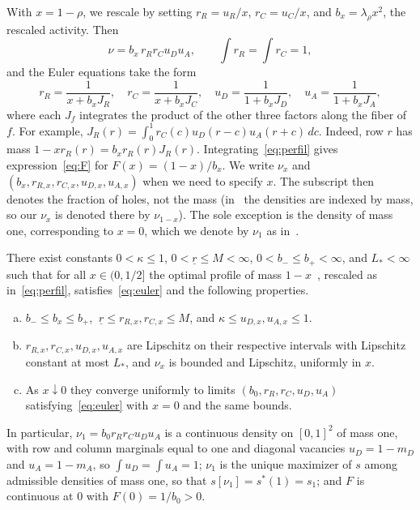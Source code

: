 With $x=1-\rho$, we rescale by setting $r_R=u_R/x$, $r_C=u_C/x$, and $b_x=\lambda_\rho x^2$, the rescaled
activity. Then
\begin{equation}\label{eq:perfil}
 \nu=b_x\,r_Rr_Cu_Du_A,\qquad \int r_R=\int r_C=1,
\end{equation} and the Euler equations take the form \begin{equation}\label{eq:euler}
 r_R=\frac1{x+b_xJ_R},\quad r_C=\frac1{x+b_xJ_C},\quad
 u_D=\frac1{1+b_xJ_D},\quad u_A=\frac1{1+b_xJ_A},
\end{equation} where each $J_f$ integrates the product of the other three factors along the fiber of $f$.
For example,
$J_R(r)=\int_0^1r_C(c)u_D(r-c)u_A(r+c)\,dc$. Indeed, row $r$ has mass $1-xr_R(r)=b_xr_R(r)J_R(r)$.
Integrating~\eqref{eq:perfil} gives
expression~\eqref{eq:F} for $F(x)=(1-x)/b_x$. We write $\nu_x$ and $(b_x,r_{R,x},r_{C,x},u_{D,x},u_{A,x})$
when we need to specify $x$.
The subscript then denotes the fraction of holes, not the mass (in~\cite{Perfil} the densities are indexed
by mass, so our $\nu_x$ is denoted there
by $\nu_{1-x}$). The sole exception is the density of mass one, corresponding to $x=0$, which we denote by
$\nu_1$ as in~\cite{Perfil}.

\begin{teorema}\label{thm:perfil} There exist constants
$0<\kappa\le1$, $0<\underline
r\le M<\infty$, $0<b_-\le
b_+<\infty$, and $L_*<\infty$ such that for all $x\in(0,1/2]$ the optimal profile of mass
$1-x$~\cite[Theorem~3.1]{Perfil}, rescaled as in~\eqref{eq:perfil}, satisfies~\eqref{eq:euler} and the
following properties.
\begin{enumerate}[(a)] \item $b_-\le b_x\le b_+$, $\ \underline r\le r_{R,x},r_{C,x}\le M$, and
$\kappa\le u_{D,x},u_{A,x}\le1$. \item
$r_{R,x},r_{C,x},u_{D,x},u_{A,x}$ are Lipschitz on their respective intervals with Lipschitz constant at
most $L_*$, and $\nu_x$ is
bounded and Lipschitz, uniformly in $x$. \item As $x\downarrow0$ they converge uniformly to limits
$(b_0,r_R,r_C,u_D,u_A)$
satisfying~\eqref{eq:euler} with $x=0$ and the same bounds. \end{enumerate} In particular,
$\nu_1=b_0r_Rr_Cu_Du_A$ is a continuous
density on $[0,1]^2$ of mass one, with row and column marginals equal to one and diagonal vacancies
$u_D=1-m_D$ and $u_A=1-m_A$, so
$\int u_D=\int u_A=1$; $\nu_1$ is the unique maximizer of $s$ among admissible densities of mass one, so
that
$s[\nu_1]=s^*(1)=s_1$; and $F$ is continuous at $0$ with $F(0)=1/b_0>0$. \end{teorema}


